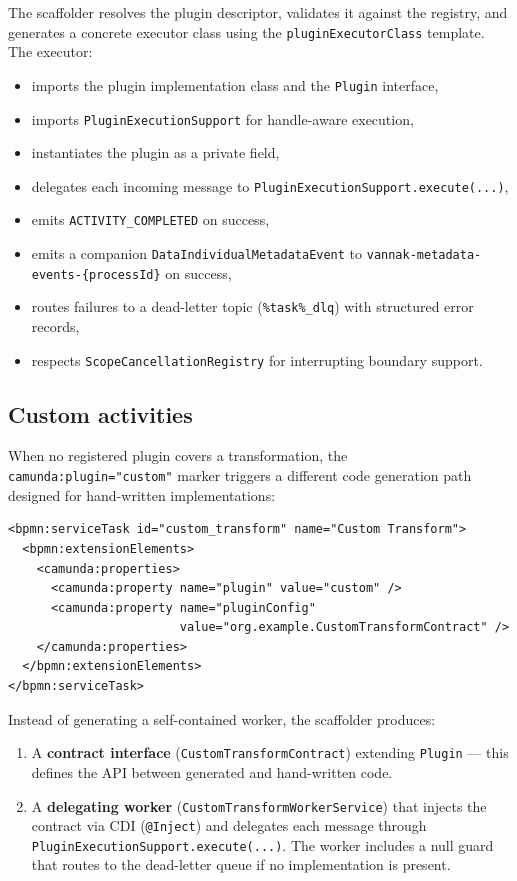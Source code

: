 The scaffolder resolves the plugin descriptor, validates it against the registry,
and generates a concrete executor class using the \texttt{pluginExecutorClass}
template. The executor:

\begin{itemize}
\item imports the plugin implementation class and the \texttt{Plugin} interface,
\item imports \texttt{PluginExecutionSupport} for handle-aware execution,
\item instantiates the plugin as a private field,
\item delegates each incoming message to \texttt{PluginExecutionSupport.execute(...)},
\item emits \texttt{ACTIVITY\_COMPLETED} on success,
\item emits a companion \texttt{DataIndividualMetadataEvent} to \texttt{vannak-metadata-events-\{processId\}} on success,
\item routes failures to a dead-letter topic (\texttt{\%task\%\_dlq}) with structured error records,
\item respects \texttt{ScopeCancellationRegistry} for interrupting boundary support.
\end{itemize}

\subsection{Custom activities}

When no registered plugin covers a transformation, the \texttt{camunda:plugin="custom"}
marker triggers a different code generation path designed for hand-written implementations:

\begin{verbatim}
<bpmn:serviceTask id="custom_transform" name="Custom Transform">
  <bpmn:extensionElements>
    <camunda:properties>
      <camunda:property name="plugin" value="custom" />
      <camunda:property name="pluginConfig" 
                        value="org.example.CustomTransformContract" />
    </camunda:properties>
  </bpmn:extensionElements>
</bpmn:serviceTask>
\end{verbatim}

Instead of generating a self-contained worker, the scaffolder produces:

\begin{enumerate}
\item A \textbf{contract interface} (\texttt{CustomTransformContract}) extending \texttt{Plugin} --- this defines the API between generated and hand-written code.
\item A \textbf{delegating worker} (\texttt{CustomTransformWorkerService}) that injects the contract via CDI (\texttt{@Inject}) and delegates each message through \texttt{PluginExecutionSupport.execute(...)}. The worker includes a null guard that routes to the dead-letter queue if no implementation is present.
\end{enumerate}

